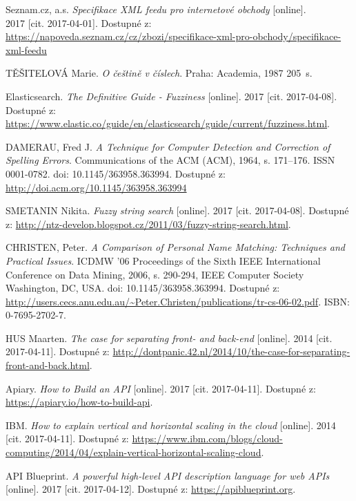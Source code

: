 \documentclass[FM,DP]{tulthesis}
\begin{document}
\begin{thebibliography}{Mm99}
 Seznam.cz, a.s. \emph{Specifikace XML feedu pro internetové obchody} [online].\\
2017 [cit. 2017-04-01]. Dostupné z:
\url{https://napoveda.seznam.cz/cz/zbozi/specifikace-xml-pro-obchody/specifikace-xml-feedu}

 TĚŠITELOVÁ Marie. \emph{O češtině v číslech}.
Praha: Academia, 1987 205~s.

 Elasticsearch. \emph{The Definitive Guide - Fuzziness} [online].
2017 [cit. 2017-04-08]. Dostupné z:
\url{https://www.elastic.co/guide/en/elasticsearch/guide/current/fuzziness.html}.

 DAMERAU, Fred J. \emph{A Technique for Computer Detection and Correction of Spelling Errors}.
Communications of the ACM (ACM), 1964, s. 171–176. ISSN 0001-0782. doi: 10.1145/363958.363994.
Dostupné z: \url{http://doi.acm.org/10.1145/363958.363994}

 SMETANIN Nikita. \emph{Fuzzy string search} [online].
2017 [cit. 2017-04-08]. 
Dostupné z: \url{http://ntz-develop.blogspot.cz/2011/03/fuzzy-string-search.html}.

 CHRISTEN, Peter. \emph{A Comparison of Personal Name Matching: Techniques and Practical Issues}.
ICDMW '06 Proceedings of the Sixth IEEE International Conference on Data Mining, 2006, s. 290-294,
IEEE Computer Society Washington, DC, USA. doi: 10.1145/363958.363994. 
Dostupné z: \url{http://users.cecs.anu.edu.au/~Peter.Christen/publications/tr-cs-06-02.pdf}. 
ISBN: 0-7695-2702-7.

 HUS Maarten. \emph{The case for separating front- and back-end} [online].
2014 [cit. 2017-04-11]. 
Dostupné z: \url{http://dontpanic.42.nl/2014/10/the-case-for-separating-front-and-back.html}.

 Apiary. \emph{How to Build an API} [online].
2017 [cit. 2017-04-11]. Dostupné z: \url{https://apiary.io/how-to-build-api}.

 IBM. \emph{How to explain vertical and horizontal scaling in the cloud} [online].
2014 [cit. 2017-04-11]. Dostupné z: 
\url{https://www.ibm.com/blogs/cloud-computing/2014/04/explain-vertical-horizontal-scaling-cloud}.

 API Blueprint. \emph{A powerful high-level API description language for web APIs} [online].
2017 [cit. 2017-04-12]. Dostupné z: \url{https://apiblueprint.org}.


\end{thebibliography}
\end{document}
